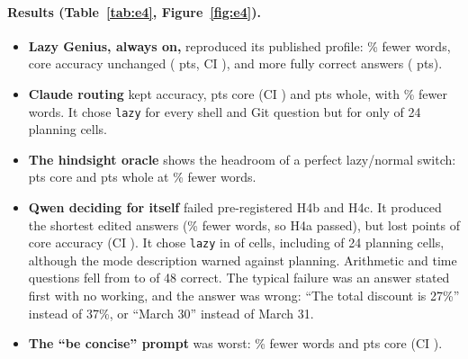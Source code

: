 \paragraph{Results (Table~\ref{tab:e4}, Figure~\ref{fig:e4}).}
\begin{itemize}
\item \textbf{Lazy Genius, always on,} reproduced its published profile: \LazyWords\% fewer words, core accuracy unchanged (\LazyCore{} pts, CI \LazyCoreCI), and more fully correct answers (\LazyWhole{} pts).
\item \textbf{Claude routing} kept accuracy, \RoutedCore{} pts core (CI \RoutedCoreCI) and \RoutedWhole{} pts whole, with \RoutedWords\% fewer words. It chose \texttt{lazy} for every shell and Git question but for only \PlanRoutedChosen{} of 24 planning cells.
\item \textbf{The hindsight oracle} shows the headroom of a perfect lazy/normal switch: \OracleCore{} pts core and \OracleWhole{} pts whole at \OracleWords\% fewer words.
\item \textbf{Qwen deciding for itself} failed pre-registered H4b and H4c. It produced the shortest edited answers (\SelfWords\% fewer words, so H4a passed), but lost \SelfCoreAbs{} points of core accuracy (CI \SelfCoreCI). It chose \texttt{lazy} in \SelfChosen{} of \Cells{} cells, including \PlanSelfChosen{} of 24 planning cells, although the mode description warned against planning. Arithmetic and time questions fell from \ArithBase{} to \ArithSelf{} of 48 correct. The typical failure was an answer stated first with no working, and the answer was wrong: ``The total discount is 27\%'' instead of 37\%, or ``March 30'' instead of March 31.
\item \textbf{The ``be concise'' prompt} was worst: \PromptWords\% fewer words and \PromptCore{} pts core (CI \PromptCoreCI).
\end{itemize}

